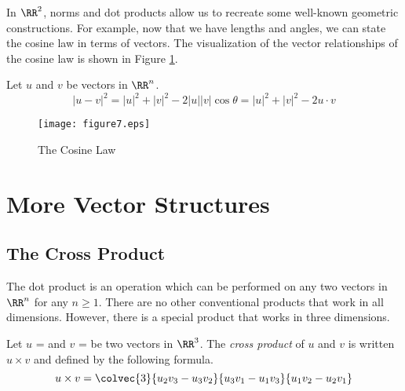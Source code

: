 \documentclass[fleqn]{report}
\begin{document}
In $\RR^2$, norms and dot products allow us to recreate some
well-known geometric constructions. For example, now that we
have lengths and angles, we can state the cosine law in terms
of vectors. The visualization of the vector relationships of
the cosine law is shown in Figure \ref{the-cosine-law}.

\begin{prop}
Let $u$ and $v$ be vectors in $\RR^n$.
\begin{equation*}
|u-v|^2 = |u|^2 + |v|^2 - 2|u||v| \cos \theta = |u|^2 + |v|^2 -
2 u \cdot v
\end{equation*}
\end{prop}

\begin{figure}[t]
\centering
\texttt{[image: figure7.eps]}
\caption{The Cosine Law}
\label{the-cosine-law}
\end{figure}

\section{More Vector Structures}
\label{vector-structures}

\subsection{The Cross Product}
\label{cross-product}

The dot product is an operation which can be performed on any
two vectors in $\RR^n$ for any $n \geq 1$. There are no other
conventional products that work in all dimensions. However,
there is a special product that works in three dimensions.

\begin{defn}
Let $u$ =  and 
$v$ =  be two 
vectors in $\RR^3$. The \emph{cross product} of $u$ and $v$ is
written $u \times v$ and defined by the following formula.
\begin{equation*}
u \times v = \colvec{3}{u_2v_3 - u_3v_2}{u_3v_1 - u_1v_3}{u_1v_2 -
u_2v_1}
\end{equation*}
\end{defn}
\end{document}
